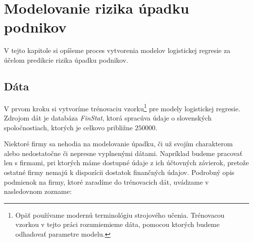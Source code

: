 \section{Modelovanie rizika úpadku podnikov}

V tejto kapitole si opíšeme proces vytvorenia modelov logistickej regresie za účelom predikcie rizika úpadku podnikov.

\subsection{Dáta}

V prvom kroku si vytvoríme trénovaciu vzorku\footnote{Opäť používame modernú terminológiu strojového učenia. Trénovacou vzorkou v tejto práci rozumiemieme dáta, pomocou ktorých budeme odhadovať parametre modelu.} pre modely logistickej regresie.
Zdrojom dát je databáza \emph{FinStat}, ktorá spracúva údaje o slovenských spoločnostiach, ktorých je celkovo približne \(250000\).

Niektoré firmy sa nehodia na modelovanie úpadku, či už svojím charakterom alebo nedostatočne či nepresne vyplnenými dátami.
Napríklad budeme pracovať len s firmami, pri ktorých máme dostupné údaje z ich účtovných závierok, pretože ostatné firmy nemajú k dispozícii dostatok finančných údajov.
Podrobný opis podmienok na firmy, ktoré zaradíme do trénovacich dát, uvádzame v nasledovnom zozname:

